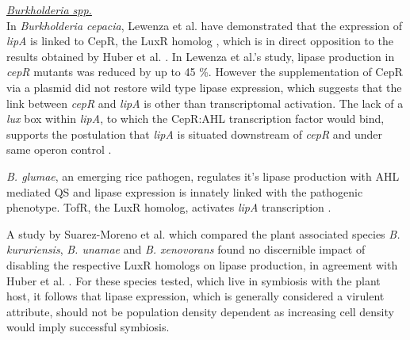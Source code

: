 \documentclass[11pt]{article}
\begin{document}
\emph{\underline{Burkholderia spp.}} 
\\In \emph{Burkholderia cepacia}, Lewenza et al. have demonstrated that the expression of \emph{lipA} is linked to CepR, the LuxR homolog \cite{lewenza1999}, which is in direct opposition to the results obtained by Huber et al. \cite{huber2001}. In Lewenza et al.'s study, lipase production in \emph{cepR} mutants was reduced by up to 45 \%. However the supplementation of CepR via a plasmid did not restore wild type lipase expression, which suggests that the link between \emph{cepR} and \emph{lipA} is other than transcriptomal activation. The lack of a \emph{lux} box within \emph{lipA}, to which the CepR:AHL transcription factor would bind, supports the postulation that \emph{lipA} is situated downstream of \emph{cepR} and under same operon control \cite{lewenza1999}. 



\emph{B. glumae}, an emerging rice pathogen, regulates it's lipase production with AHL mediated QS and lipase expression is innately linked with the pathogenic phenotype. TofR, the LuxR homolog, activates \emph{lipA} transcription \cite{devescovi_07}. 


A study by Suarez-Moreno et al. which compared the plant associated species \emph{B. kururiensis}, \emph{B. unamae} and \emph{B. xenovorans} found no discernible impact of disabling the respective LuxR homologs on lipase production, in agreement with Huber et al. \cite{huber2001,suarez2010}. For these species tested, which live in symbiosis with the plant host, it follows that lipase expression, which is generally considered a virulent attribute, should not be population density dependent as increasing cell density would imply successful symbiosis. 
\end{document}
